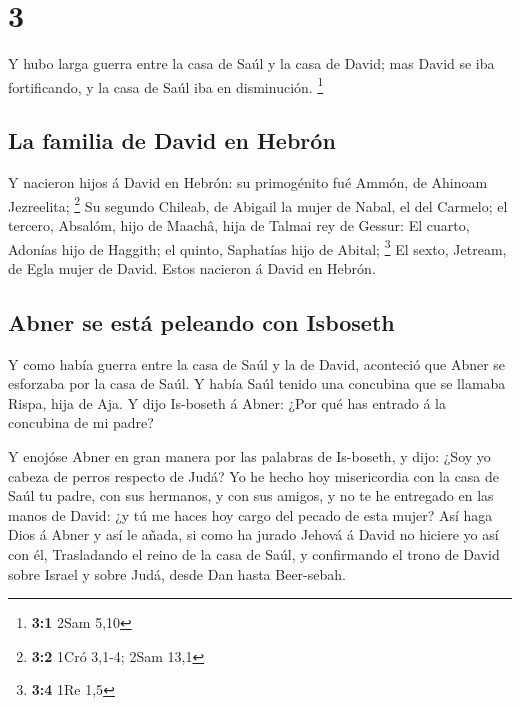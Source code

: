 \hypertarget{section-2}{%
\section{3}\label{section-2}}

 Y hubo larga guerra entre la casa de Saúl y la casa de
David; mas David se iba fortificando, y la casa de Saúl iba en
disminución. \footnote{\textbf{3:1} 2Sam 5,10}

\hypertarget{la-familia-de-david-en-hebruxf3n}{%
\subsection{La familia de David en
Hebrón}\label{la-familia-de-david-en-hebruxf3n}}

 Y nacieron hijos á David en Hebrón: su primogénito fué
Ammón, de Ahinoam Jezreelita; \footnote{\textbf{3:2} 1Cró 3,1-4; 2Sam
  13,1}  Su segundo Chileab, de Abigail la mujer de Nabal,
el del Carmelo; el tercero, Absalóm, hijo de Maachâ, hija de Talmai rey
de Gessur:  El cuarto, Adonías hijo de Haggith; el quinto,
Saphatías hijo de Abital; \footnote{\textbf{3:4} 1Re 1,5} 
El sexto, Jetream, de Egla mujer de David. Estos nacieron á David en
Hebrón.

\hypertarget{abner-se-estuxe1-peleando-con-isboseth}{%
\subsection{Abner se está peleando con
Isboseth}\label{abner-se-estuxe1-peleando-con-isboseth}}

 Y como había guerra entre la casa de Saúl y la de David,
aconteció que Abner se esforzaba por la casa de Saúl.  Y
había Saúl tenido una concubina que se llamaba Rispa, hija de Aja. Y
dijo Is-boseth á Abner: ¿Por qué has entrado á la concubina de mi padre?

 Y enojóse Abner en gran manera por las palabras de
Is-boseth, y dijo: ¿Soy yo cabeza de perros respecto de Judá? Yo he
hecho hoy misericordia con la casa de Saúl tu padre, con sus hermanos, y
con sus amigos, y no te he entregado en las manos de David: ¿y tú me
haces hoy cargo del pecado de esta mujer?  Así haga Dios á
Abner y así le añada, si como ha jurado Jehová á David no hiciere yo así
con él,  Trasladando el reino de la casa de Saúl, y
confirmando el trono de David sobre Israel y sobre Judá, desde Dan hasta
Beer-sebah.

